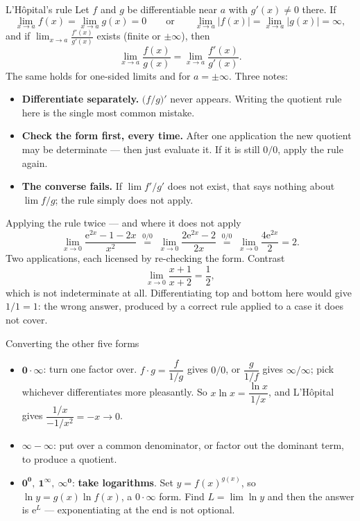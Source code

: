 \begin{rulebox}{L'H\^opital's rule}
Let $f$ and $g$ be differentiable near $a$ with $g'(x)\neq0$ there. If
\[
  \lim_{x\to a}f(x)=\lim_{x\to a}g(x)=0
  \qquad\text{or}\qquad
  \lim_{x\to a}|f(x)|=\lim_{x\to a}|g(x)|=\infty ,
\]
and if $\displaystyle\lim_{x\to a}\frac{f'(x)}{g'(x)}$ exists (finite or
$\pm\infty$), then
\[
  \lim_{x\to a}\frac{f(x)}{g(x)}=\lim_{x\to a}\frac{f'(x)}{g'(x)} .
\]
The same holds for one-sided limits and for $a=\pm\infty$. Three notes:
\begin{itemize}[leftmargin=1.6em,itemsep=0.3ex]
  \item \textbf{Differentiate separately.} $\bigl(f/g\bigr)'$ never
        appears. Writing the quotient rule here is the single most common
        mistake.
  \item \textbf{Check the form first, every time.} After one application
        the new quotient may be determinate --- then just evaluate it. If
        it is still $0/0$, apply the rule again.
  \item \textbf{The converse fails.} If $\lim f'/g'$ does not exist, that
        says nothing about $\lim f/g$; the rule simply does not apply.
\end{itemize}
\end{rulebox}

\begin{rulebox}{Applying the rule twice --- and where it does not apply}
\[
  \lim_{x\to0}\frac{\mathrm{e}^{2x}-1-2x}{x^{2}}
  \;\overset{0/0}{=}\;\lim_{x\to0}\frac{2\mathrm{e}^{2x}-2}{2x}
  \;\overset{0/0}{=}\;\lim_{x\to0}\frac{4\mathrm{e}^{2x}}{2}=2 .
\]
Two applications, each licensed by re-checking the form. Contrast
\[
  \lim_{x\to0}\frac{x+1}{x+2}=\frac{1}{2},
\]
which is not indeterminate at all. Differentiating top and bottom here
would give $1/1=1$: the wrong answer, produced by a correct rule applied to
a case it does not cover.
\end{rulebox}

\begin{rulebox}{Converting the other five forms}
\begin{itemize}[leftmargin=1.6em,itemsep=0.4ex]
  \item $\mathbf{0\cdot\infty}$: turn one factor over.
        $f\cdot g=\dfrac{f}{1/g}$ gives $0/0$, or
        $\dfrac{g}{1/f}$ gives $\infty/\infty$; pick whichever
        differentiates more pleasantly. So
        $x\ln x=\dfrac{\ln x}{1/x}$, and L'H\^opital gives
        $\dfrac{1/x}{-1/x^{2}}=-x\to0$.
  \item $\mathbf{\infty-\infty}$: put over a common denominator, or
        factor out the dominant term, to produce a quotient.
  \item $\mathbf{0^{0}},\ \mathbf{1^{\infty}},\ \mathbf{\infty^{0}}$:
        \textbf{take logarithms}. Set $y=f(x)^{g(x)}$, so
        $\ln y=g(x)\ln f(x)$, a $0\cdot\infty$ form. Find
        $L=\lim\ln y$ and then the answer is $\mathrm{e}^{L}$ ---
        exponentiating at the end is not optional.
\end{itemize}
\end{rulebox}

